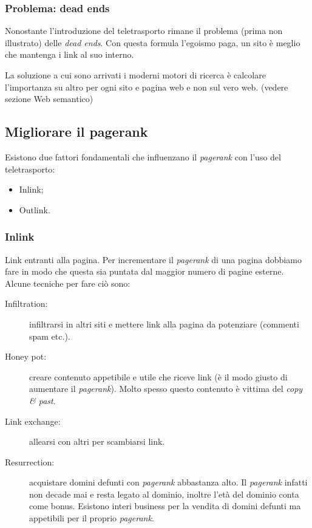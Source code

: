 		
			\subsubsection{Problema: dead ends}
				Nonostante l'introduzione del teletrasporto rimane il problema (prima non illustrato) delle \emph{dead ends}. Con questa formula l'egoismo paga, un sito è meglio che mantenga i link al suo interno.
				
				La soluzione a cui sono arrivati i moderni motori di ricerca è calcolare l'importanza su altro per ogni sito e pagina web e non sul vero web. (vedere sezione Web semantico)
		
		\subsection{Migliorare il pagerank}
			Esistono due fattori fondamentali che influenzano il \emph{pagerank} con l'uso del teletrasporto:
			\begin{itemize}
				\item Inlink;
				\item Outlink.
			\end{itemize}
		
			\subsubsection{Inlink}
				Link entranti alla pagina. Per incrementare il \emph{pagerank} di una pagina dobbiamo fare in modo che questa sia puntata dal maggior numero di pagine esterne. Alcune tecniche per fare ciò sono:
				\begin{description}
					\item[Infiltration:] infiltrarsi in altri siti e mettere link alla pagina da potenziare (commenti spam etc.).
					\item[Honey pot:] creare contenuto appetibile e utile che riceve link (è il modo giusto di aumentare il \emph{pagerank}). Molto spesso questo contenuto è vittima del \emph{copy \& past}.
					\item[Link exchange:] allearsi con altri per scambiarsi link.
					\item[Resurrection:] acquistare domini defunti con \emph{pagerank} abbastanza alto. Il \emph{pagerank} infatti non decade mai e resta legato al dominio, inoltre l'età del dominio conta come bonus. Esistono interi business per la vendita di domini defunti ma appetibili per il proprio \emph{pagerank}.
				\end{description}
				
